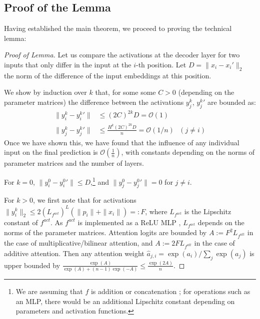 \documentclass[11pt,a4paper]{article}
\newcounter{theorem}
\begin{document}
\subsection{Proof of the Lemma}
Having established the main theorem, we proceed to proving the technical lemma:
\begin{proof}[Proof of Lemma]
Let us compare the activations at the decoder layer for two inputs that only differ in the input at the $i$-th position.
Let $D = \|x_i-x_i'\|_2$ the norm of the difference of the input embeddings at this position.

	We show by induction over $k$ that, for some some $C > 0$ (depending on the parameter matrices) the difference between the activations $y_j^k$, ${y_j^k}'$ are bounded as: %
\begin{equation}
\begin{aligned}
	\|y_i^k-{y_i^k}'\| &\leq (2C)^{2k}D = \mathcal{O}(1) \\
	\|y_j^k-{y_j^k}'\| &\leq \frac{H^k (2C)^{2k}D}{n} = \mathcal{O}(1/n)\ \ \ (j \neq i)
	\end{aligned}
\end{equation}
Once we have shown this, we have found that the influence of any individual input on the final prediction is $\mathcal{O}(\frac{1}{n})$, with constants depending on the norms of parameter matrices and the number of layers.


For $k=0$, $\|y_i^0 - {y_i^0}'\| \leq D$,\footnote{We are assuming that $f$ is addition or concatenation \cite{vaswani2017attention}; for operations such as an MLP, there would be an additional Lipschitz constant depending on parameters and activation functions.}
and %
$\|y_j^0 - {y_j^0}'\| = 0$ for $j \neq i$.

For $k>0$, we first note that for activations $\|y_i^k\|_2 \leq 2 \left(L_{f^{act}}\right)^{L}  (\|p_i\| + \|x_i\|) =: F$, where
$L_{f^{act}}$ is the Lipschitz constant of $f^{act}$.
As $f^{act}$ is implemented as a ReLU MLP \cite{vaswani2017attention}, $L_{f^{act}}$ depends on the norms of the parameter matrices.
Attention logits are bounded by $A := F^2 L_{f^{att}}$ in the case of multiplicative/bilinear attention, and $A := 2 F L_{f^{att}}$ in the case of additive attention.
Then any attention weight $\widehat{a}_{j,i} = \exp(a_i)/\sum_j \exp(a_j)$ is upper bounded by $\frac{\exp(A)}{\exp(A) + (n-1) \exp(-A)} \leq \frac{\exp(2A)}{n}$.


\end{proof}
\end{document}
